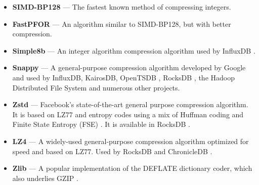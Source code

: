 \begin{itemize}[leftmargin=4mm]
\item \textbf{SIMD-BP128} \cite{fastpfor} --- The fastest known method of compressing integers.
\item \textbf{FastPFOR} \cite{fastpfor} --- An algorithm similar to SIMD-BP128, but with better compression.
\item \textbf{Simple8b} \cite{simple8b} --- An integer algorithm compression algorithm used by InfluxDB \cite{influxDB}.
\item \textbf{Snappy} \cite{snappy} --- A general-purpose compression algorithm developed by Google and used by InfluxDB, KairosDB, OpenTSDB \cite{openTSDB}, RocksDB \cite{rocksDB}, the Hadoop Distributed File System \cite{hdfs} and numerous other projects.
\item \textbf{Zstd} \cite{zstd} --- Facebook's state-of-the-art general purpose compression algorithm. It is based on LZ77 and entropy codes using a mix of Huffman coding and Finite State Entropy (FSE) \cite{fse}. It is available in RocksDB \cite{rocksDB}.
\item \textbf{LZ4} \cite{lz4} --- A widely-used general-purpose compression algorithm optimized for speed and based on LZ77. Used by RocksDB and ChronicleDB \cite{chronicleDB}.
\item \textbf{Zlib} \cite{zlib} --- A popular implementation of the DEFLATE \cite{deflate} dictionary coder, which also underlies GZIP \cite{gzip}.

\end{itemize}

